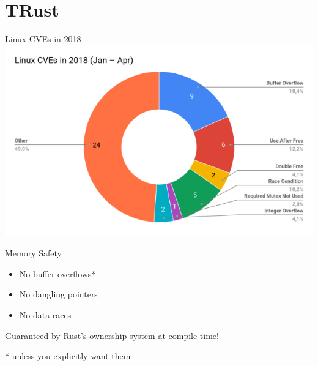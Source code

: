 \documentclass{beamer}
\begin{document}
\section{TRust}

    \begin{frame}{Linux CVEs in 2018}
        \includegraphics[width=\textwidth]{linux_cves_2018}
    \end{frame}

    \begin{frame}{Memory Safety}
        \Large{
            \begin{itemize}
                \item No buffer overflows*
                \item No dangling pointers
                \item No data races
            \end{itemize}
            \vfill
            Guaranteed by Rust's ownership system
            \underline{at compile time!}
        }
        \vfill
        \vfill
        \small{* unless you explicitly want them}
    \end{frame}
\end{document}
